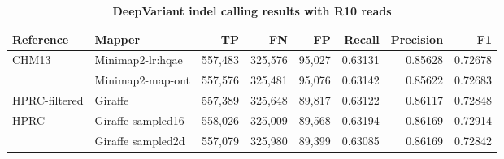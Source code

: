 \documentclass[11pt]{ucscthesis}
\begin{document}
\begin{landscape}
\begin{table}[htb]
    \centering
    \begin{tabular}{|l|l|r|r|r|r|r|r|}
        \hline
        Reference         & Mapper               & TP          & FN          & FP         & Recall      & Precision   & F1 \\
        \hline
        CHM13             & Minimap2-lr:hqae     & 557,483     & 325,576     & 95,027     & 0.63131     & 0.85628     & 0.72678 \\
                          & Minimap2-map-ont     & 557,576     & 325,481     & 95,076     & 0.63142     & 0.85622     & 0.72683 \\
        HPRC-filtered     & Giraffe              & 557,389     & 325,648     & 89,817     & 0.63122     & 0.86117     & 0.72848 \\
        HPRC              & Giraffe sampled16    & 558,026     & 325,009     & 89,568     & 0.63194     & 0.86169     & 0.72914 \\
                          & Giraffe sampled2d    & 557,079     & 325,980     & 89,399     & 0.63085     & 0.86169     & 0.72842 \\

        \hline
    \end{tabular}
    \caption[DeepVariant indel R10 results]{\textbf{DeepVariant indel calling results with R10 reads}}
    \label{tab:dv_indel_r10}
\end{table}


\end{landscape}
\end{document}
